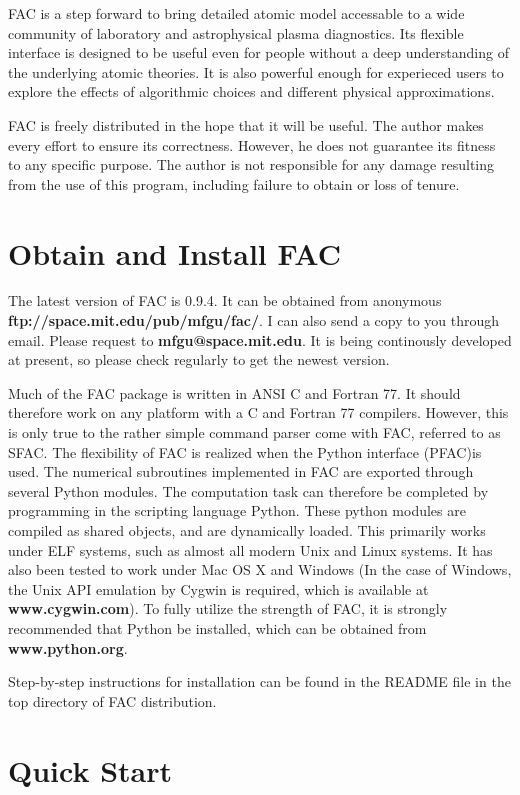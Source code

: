 \documentclass[twoside,letterpaper]{refrep}
\newcommand{\facversion}{{0.9.4}\xspace}
\begin{document}
FAC is a step forward to bring detailed atomic model accessable to a wide
community of laboratory and astrophysical plasma diagnostics. Its flexible
interface is designed to be useful even for people without a deep
understanding of the underlying atomic theories. It is also powerful enough
for experieced users to explore the effects of algorithmic choices and
different physical approximations.

FAC is freely distributed in the hope that it will be useful. The author makes
every effort to ensure its correctness. However, he does not guarantee its
fitness to any specific purpose. The author is not responsible for any damage
resulting from the use of this program, including failure to obtain or loss of
tenure. 

\section{Obtain and Install FAC}
\label{sec:install}
The latest version of FAC is \facversion. It can be obtained from anonymous
\textbf{ftp://space.mit.edu/pub/mfgu/fac/}. I can also send a copy to you
through email. Please request to \textbf{mfgu@space.mit.edu}. It is being
continously developed at present, so please check regularly to get the newest
version.

Much of the FAC package is written in ANSI C and Fortran 77. It should 
therefore work on any platform with a C and Fortran 77 compilers. However, 
this is only true to the rather simple command parser come with FAC, referred 
to as SFAC. The flexibility of FAC is realized when the Python interface
(PFAC)is used. The numerical subroutines implemented in FAC are exported
through several Python modules. The computation task can therefore be
completed by programming in the scripting language Python. These python
modules are compiled as shared objects, and are dynamically loaded. This
primarily works under ELF systems, such as almost all modern Unix and Linux
systems. It has also been tested to work under Mac OS X and Windows (In the
case of Windows, the Unix API emulation by Cygwin is required, which is
available at \textbf{www.cygwin.com}). To fully utilize the strength of  
FAC, it is strongly recommended that Python be installed, which can be obtained
from \textbf{www.python.org}.

Step-by-step instructions for installation can be found in the README file in
the top directory of FAC distribution.

\section{Quick Start}
\label{sec:start}
\end{document}
